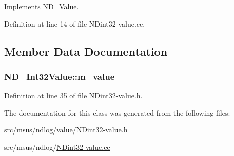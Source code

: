 Implements \hyperlink{class_n_d___value_a7660a0e6c07a198410fc05725d903219}{N\-D\-\_\-\-Value}.



Definition at line 14 of file N\-Dint32-\/value.\-cc.



\subsection{Member Data Documentation}
\hypertarget{class_n_d___int32_value_a065f85a575dcebb0f03947c752625881}{
\subsubsection[{m\-\_\-value}]{ N\-D\-\_\-\-Int32\-Value\-::m\-\_\-value\hspace{0.3cm}{\ttfamily [protected]}}}\label{class_n_d___int32_value_a065f85a575dcebb0f03947c752625881}


Definition at line 35 of file N\-Dint32-\/value.\-h.



The documentation for this class was generated from the following files\-:\begin{DoxyCompactItemize}
\item 
src/msus/ndlog/value/\hyperlink{_n_dint32-value_8h}{N\-Dint32-\/value.\-h}\item 
src/msus/ndlog/\hyperlink{_n_dint32-value_8cc}{N\-Dint32-\/value.\-cc}\end{DoxyCompactItemize}

